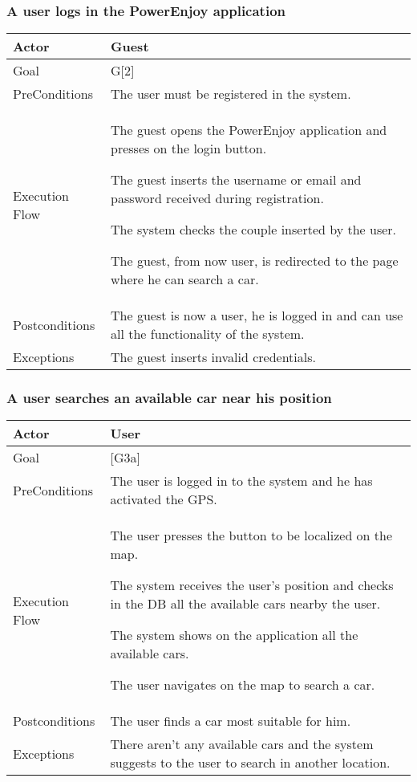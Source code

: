 \documentclass{article}
\begin{document}
	\subsubsection{A user logs in the PowerEnjoy application}
	\begin{tabularx}{\textwidth}{  l  X  }
		\hline
		Actor & Guest\\
		\hline
		Goal & G[2]\\
		\hline
		PreConditions & The user must be registered in the system.\\
		\hline
		Execution Flow & \item{The guest opens the PowerEnjoy application and presses on the login button.}
										 \item{The guest inserts the username or email and password received during registration.}
										 \item{The system checks the couple inserted by the user.}
										 \item{The guest, from now user, is redirected to the page where he can search a car.}\\
		\hline
		Postconditions & The guest is now a user, he is logged in and can use all the functionality of the system.\\
		\hline
		Exceptions & \item{The guest inserts invalid credentials.}\\
		\hline
	\end{tabularx}

	\subsubsection{A user searches an available car near his position}
	\begin{tabularx}{\textwidth}{  l  X  }
		\hline
		Actor & User\\
		\hline
		Goal & [G3a]\\
		\hline
		PreConditions & The user is logged in to the system and he has activated the GPS.\\
		\hline
		Execution Flow & \item{The user presses the button to be localized on the map.}
										 \item{The system receives the user's position and checks in the DB all the available cars nearby the user.}
										 \item{The system shows on the application all the available cars.}
										 \item{The user navigates on the map to search a car.}\\
		\hline
		Postconditions & The user finds a car most suitable for him.\\
		\hline
		Exceptions & \item{There aren't any available cars and the system suggests to the user to search in another location.}\\
		\hline
	\end{tabularx}
\end{document}
